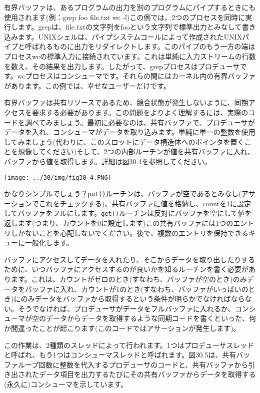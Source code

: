 有界バッファは、あるプログラムの出力を別のプログラムにパイプするときにも使用されます(例：grep
foo file.txt \textbar{} wc
-l)この例では、2つのプロセスを同時に実行します。grepは、file.txtの文字列をfooという文字列で標準出力とみなして書き込みます。UNIXシェルは、パイプシステムコールによって作成されたUNIXパイプと呼ばれるものに出力をリダイレクトします。このパイプのもう一方の端はプロセスwcの標準入力に接続されています。これは単純に入力ストリームの行数を数え、その結果を出力します。したがって、grepプロセスはプロデューサです。wcプロセスはコンシューマです。それらの間にはカーネル内の有界バッファがあります。この例では、幸せなユーザーだけです。

有界バッファは共有リソースであるため、競合状態が発生しないように、同期アクセスを要求する必要があります。この問題をよりよく理解するには、実際のコードを調べてみましょう。最初に必要なのは、共有バッファで、プロデューサがデータを入れ、コンシューマがデータを取り込みます。単純に単一の整数を使用してみましょう(代わりに、このスロットにデータ構造体へのポインタを置くことを想像してください)そして、2つの内部ルーチンが値を共有バッファに入れ、バッファから値を取得します。詳細は図30.4を参照してください。

\texttt{[image: ../30/img/fig30\_4.PNG]}

かなりシンプルでしょう？\texttt{put()}ルーチンは、バッファが空であるとみなし(アサーションでこれをチェックする)、共有バッファに値を格納し、countを1に設定してバッファをフルにします。\texttt{get()}ルーチンは反対にバッファを空にして値を返します(つまり、カウントを0に設定します)この共有バッファには1つのエントリしかないことを心配しないでください。後で、複数のエントリを保持できるキューに一般化します。

バッファにアクセスしてデータを入れたり、そこからデータを取り出したりするために、いつバッファにアクセスするのが良いかを知るルーチンを書く必要があります。これは、カウントがゼロのとき(すなわち、バッファが空のとき)のみデータをバッファに入れ、カウントが1のとき(すなわち、バッファがいっぱいのとき)にのみデータをバッファから取得するという条件が明らかでなければならない。そうでなければ、プロデューサがデータをフルバッファに入れるか、コンシューマが空のデータからデータを取得するような同期コードを書くといった、何か間違ったことが起こります(このコードではアサーションが発生します)。

この作業は、2種類のスレッドによって行われます。1つはプロデューサスレッドと呼ばれ、もう1つはコンシューマスレッドと呼ばれます。図30.5は、共有バッファループ回数に整数を代入するプロデューサのコードと、共有バッファから引き出されたデータ項目を出力するたびにその共有バッファからデータを取得する(永久に)コンシューマを示しています。

